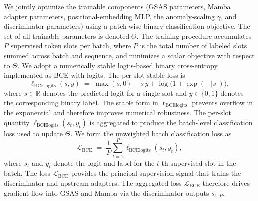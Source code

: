 We jointly optimize the trainable components (GSAS parameters, Mamba adapter parameters, positional-embedding MLP, the anomaly-scaling \(\gamma\), and discriminator parameters) using a patch-wise binary classification objective. The set of all trainable parameters is denoted \(\Theta\). The training procedure accumulates \(P\) supervised token slots per batch, where \(P\) is the total number of labeled slots summed across batch and sequence, and minimizes a scalar objective with respect to \(\Theta\). We adopt a numerically stable logits-based binary cross-entropy implemented as BCE-with-logits. The per-slot stable loss is
\begin{equation}
\ell_{\mathrm{BCElogits}}(s,y) \;=\; \max(s,0) - s\,y + \log\big(1+\exp(-|s|)\big),
\end{equation}
where \(s\in\mathbb{R}\) denotes the predicted logit for a single slot and \(y\in\{0,1\}\) denotes the corresponding binary label. The stable form in \(\ell_{\mathrm{BCElogits}}\) prevents overflow in the exponential and therefore improves numerical robustness. The per-slot quantity \(\ell_{\mathrm{BCElogits}}(s_t,y_t)\) is aggregated to produce the batch-level classification loss used to update \(\Theta\). We form the unweighted batch classification loss as
\begin{equation}
\mathcal{L}_{\mathrm{BCE}} \;=\; \frac{1}{P}\sum_{t=1}^P \ell_{\mathrm{BCElogits}}(s_t,y_t),
\end{equation}
where \(s_t\) and \(y_t\) denote the logit and label for the \(t\)-th supervised slot in the batch. The loss \(\mathcal{L}_{\mathrm{BCE}}\) provides the principal supervision signal that trains the discriminator and upstream adapters. The aggregated loss \(\mathcal{L}_{\mathrm{BCE}}\) therefore drives gradient flow into GSAS and Mamba via the discriminator outputs \(s_{1:P}\).

